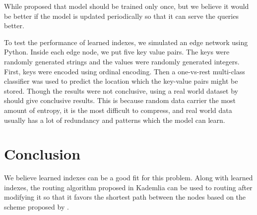 While \citet{kraska2018} proposed that model should be trained only once, but we
believe it would be better if the model is updated periodically so that it can
serve the queries better.

To test the performance of learned indexes, we simulated an edge network using
Python. Inside each edge node, we put five key value pairs. The keys were
randomly generated strings and the values were randomly generated integers.
First, keys were encoded using ordinal encoding. Then a one-vs-rest multi-class
classifier was used to predict the location which the key-value pairs might be
stored. Though the results were not conclusive, using a real world dataset by
\citet{taxi&limousinecommissionNewYorkTaxi} should give conclusive results. This
is because random data carrier the most amount of entropy, it is the most
difficult to compress, and real world data usually has a lot of redundancy and
patterns which the model can learn.

\section{Conclusion}

We believe learned indexes can be a good fit for this problem. Along with
learned indexes, the routing algorithm proposed in Kademlia can be used to
routing after modifying it so that it favors the shortest path between the nodes
based on the scheme proposed by \citet{mengweiImprovementKademliaBased2013}.